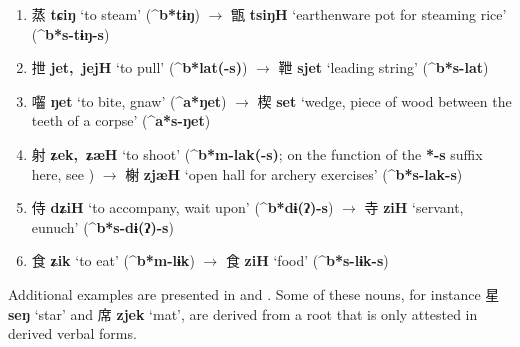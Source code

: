\documentclass[oneside,a4paper,11pt]{article}
\newcommand{\ipa}[1]{\textbf{{\phon\mbox{#1}}}} %
\newcommand{\zh}[1]{{\cn #1}}
\newcommand{\zhc}[2]{\zh{#1} \ipa{#2}}
\begin{document}
\begin{enumerate}
\item \zhc{蒸}{tɕiŋ} `to steam' (\ipa{^b*tɨŋ}) $\rightarrow$ \zhc{甑}{tsiŋH} `earthenware pot for steaming rice' (\ipa{^b*s-tɨŋ-s})
\item \zhc{抴}{jet, jejH} `to pull' (\ipa{^b*lat(-s)}) $\rightarrow$ \zhc{靾}{sjet} `leading string' (\ipa{^b*s-lat})
\item \zhc{囓}{ŋet} `to bite, gnaw' (\ipa{^a*ŋet}) $\rightarrow$ \zhc{楔}{set} `wedge, piece of wood between the teeth of a corpse' (\ipa{^a*s-ŋet})
\item \zhc{射}{ʑek, ʑæH} `to shoot' (\ipa{^b*m-lak(-s)}; on the function of the \ipa{*-s} suffix here, see \citealt{jacques18antipass}) $\rightarrow$ \zhc{榭}{zjæH} `open hall for archery exercises' (\ipa{^b*s-lak-s}) 
\item \zhc{侍}{dʑiH} `to accompany, wait upon' (\ipa{^b*dɨ(ʔ)-s}) $\rightarrow$ \zhc{寺}{ziH} `servant, eunuch' (\ipa{^b*s-dɨ(ʔ)-s})
\item \zhc{食}{ʑik} `to eat' (\ipa{^b*m-lɨk}) $\rightarrow$ \zhc{食}{ziH} `food' (\ipa{^b*s-lɨk-s})
\end{enumerate}

Additional examples are presented in \citet[56]{bs14oc} and \citealt{sagart12sprefix}. Some of these nouns, for instance \zhc{星}{seŋ} `star’ and \zhc{席}{zjek} `mat’, are derived from a root that is only attested in derived verbal forms.
\end{document}
